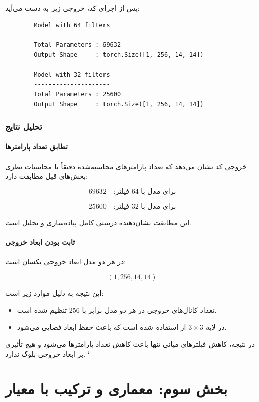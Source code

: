 \documentclass{article}
\begin{document}
پس از اجرای کد، خروجی زیر به دست می‌آید:

\begin{latin}
	\begin{verbatim}
		Model with 64 filters
		---------------------
		Total Parameters : 69632
		Output Shape     : torch.Size([1, 256, 14, 14])
		
		Model with 32 filters
		---------------------
		Total Parameters : 25600
		Output Shape     : torch.Size([1, 256, 14, 14])
	\end{verbatim}
\end{latin}


\subsubsection{تحلیل نتایج}

\paragraph{تطابق تعداد پارامترها}

خروجی کد نشان می‌دهد که تعداد پارامترهای محاسبه‌شده دقیقاً با محاسبات نظری بخش‌های قبل مطابقت دارد:

\[
69632 \quad \text{:برای مدل با 64 فیلتر}
\]

\[
25600 \quad \text{:برای مدل با 32 فیلتر}
\]

این مطابقت نشان‌دهنده درستی کامل پیاده‌سازی و تحلیل است.

\paragraph{ثابت بودن ابعاد خروجی}

در هر دو مدل ابعاد خروجی یکسان است:

\[
(1, 256, 14, 14)
\]

این نتیجه به دلیل موارد زیر است:
\begin{itemize}
	\item تعداد کانال‌های خروجی در هر دو مدل برابر با 256 تنظیم شده است.
	\item در لایه \(3\times3\) از  استفاده شده است که باعث حفظ ابعاد فضایی می‌شود.
\end{itemize}

در نتیجه، کاهش فیلترهای میانی تنها باعث کاهش تعداد پارامترها می‌شود و هیچ تأثیری بر ابعاد خروجی بلوک ندارد.
`
\newpage


\section{بخش سوم: معماری  و ترکیب با معیار }
\end{document}
